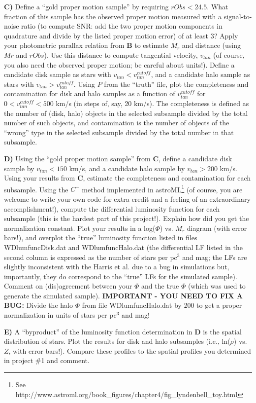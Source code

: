 {\bf C)} Define a ``gold proper motion sample'' by requiring $rObs < 24.5$. What fraction of
this sample has the observed proper motion measured with a signal-to-noise ratio (to compute
SNR: add the two proper motion components in quadrature and divide by the listed proper
motion error) of at least 3? Apply your photometric parallax relation from {\bf B} to estimate
$M_r$ and distance (using $Mr$ and $rObs$). Use this distance to compute tangential velocity,
$v_{tan}$ (of course, you also need the observed proper motion; be careful about units!). Define
a candidate disk sample as stars with $v_{tan}< v_{tan}^{cutoff}$, and a candidate halo sample as stars with
$v_{tan} > v_{tan}^{cutoff}$. Using $P$ from the “truth” file, plot the completeness and contamination 
for disk and halo samples as a function of $v_{tan}^{cutoff}$ for $0 < v_{tan}^{cutoff} < 500$ km/s (in steps 
of, say, 20 km/s). The completeness is defined as the number of (disk, halo) objects in the selected 
subsample divided by the total number of such objects, and contamination is the number of objects
 of the ``wrong'' type in the selected subsample divided by the total number in that subsample.

{\bf D)} Using the ``gold proper motion sample'' from {\bf C}, define a candidate disk sample by
$v_{tan} < 150$ km/s, and a candidate halo sample by $v_{tan} > 200$ km/s. Using your results 
from {\bf C}, estimate the completeness and contamination for each subsample. Using the 
$C^−$ method implemented in astroML\footnote{See
http://www.astroml.org/book\_figures/chapter4/fig\_lyndenbell\_toy.html} (of course, you
are welcome to write your own code for extra credit and a feeling of an extraordinary accomplishment!), 
compute the differential luminosity function for each subsample (this is the hardest 
part of this project!). Explain how did you get the normalization constant. Plot your results in a
log($\Phi$) vs. $M_r$ diagram (with error bars!), and overplot the “true” luminosity function listed in 
files WDlumfuncDisk.dat and WDlumfuncHalo.dat (the differential LF listed in the second column is 
expressed as the number of stars per pc$^3$ and mag; the LFs are slightly inconsistent with the Harris 
et al. due to a bug in simulations but, importantly, they do correspond to the ``true'' LFs for the simulated 
sample). Comment on (dis)agreement between your $\Phi$ and the true $\Phi$ (which was used to generate 
the simulated sample). {\bf IMPORTANT - YOU NEED TO FIX A BUG:} Divide the halo $\Phi$ from file WDlumfuncHalo.dat 
by 200 to get a proper normalization in units of stars per pc$^3$ and mag! 

{\bf E)} A ``byproduct'' of the luminosity function determination in {\bf D} is the spatial distribution of stars. 
Plot the results for disk and halo subsamples (i.e., ln($\rho$) vs. $Z$, with error bars!). Compare these profiles
 to the spatial profiles you determined in project \#1 and comment.





